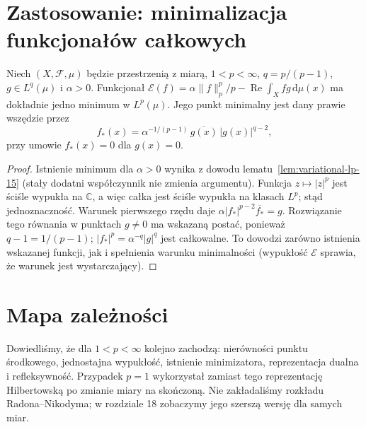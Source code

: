 \section{Zastosowanie: minimalizacja funkcjonałów całkowych}
\begin{twierdzenie}
\label{thm:minimize-lp-15}
Niech $(X,\mathcal F,\mu)$ będzie przestrzenią z miarą,
$1<p<\infty$, $q=p/(p-1)$,
$g\in L^q(\mu)$ i $\alpha>0$.
Funkcjonał $\mathcal E(f)=\alpha\|f\|_p^p/p
-\operatorname{Re}\int_X f g\,\mathrm d\mu(x)$
ma dokładnie jedno minimum w $L^p(\mu)$. Jego
punkt minimalny jest dany prawie wszędzie przez
\[
f_*(x)=\alpha^{-1/(p-1)}\,\overline{g(x)}\,|g(x)|^{q-2},
\]
przy umowie $f_*(x)=0$ dla $g(x)=0$.
\end{twierdzenie}
\begin{proof}
Istnienie minimum dla $\alpha>0$ wynika z dowodu
lematu~\ref{lem:variational-lp-15} (stały dodatni
współczynnik nie zmienia argumentu). Funkcja
$z\mapsto|z|^p$ jest ściśle wypukła na $\mathbb C$,
a więc całka jest ściśle wypukła na klasach $L^p$;
stąd jednoznaczność. Warunek pierwszego rzędu daje
$\alpha|f_*|^{p-2}\overline{f_*}=g$.
Rozwiązanie tego równania w punktach $g\ne0$
ma wskazaną postać, ponieważ $q-1=1/(p-1)$;
$|f_*|^p=\alpha^{-q}|g|^q$ jest całkowalne.
To dowodzi zarówno istnienia wskazanej funkcji,
jak i spełnienia warunku minimalności (wypukłość
$\mathcal E$ sprawia, że warunek jest wystarczający).
\end{proof}

\enlargethispage{3\baselineskip}
\section{Mapa zależności}
Dowiedliśmy, że dla $1<p<\infty$ kolejno zachodzą:
nierówności punktu środkowego, jednostajna wypukłość,
istnienie minimizatora, reprezentacja dualna i
refleksywność. Przypadek $p=1$ wykorzystał zamiast tego
reprezentację Hilbertowską po zmianie miary na skończoną.
Nie zakładaliśmy rozkładu Radona--Nikodyma; w rozdziale 18
zobaczymy jego szerszą wersję dla samych miar.
